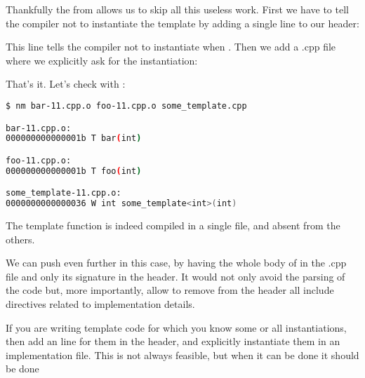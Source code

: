 \bigskip

Thankfully the  from  allows us to skip
all this useless work. First we have to tell the compiler not to
instantiate the template by adding a single line to our header:


This line tells the compiler not to instantiate
 when . Then we add a .cpp file
where we explicitly ask for the instantiation:



That's it. Let's check with :

\begin{lstlisting}[language=bash]
$ nm bar-11.cpp.o foo-11.cpp.o some_template.cpp

bar-11.cpp.o:
000000000000001b T bar(int)

foo-11.cpp.o:
000000000000001b T foo(int)

some_template-11.cpp.o:
0000000000000036 W int some_template<int>(int)
\end{lstlisting}

The template function is indeed compiled in a single file, and absent
from the others.

We can push even further in this case, by having the whole body of
 in the .cpp file and only its signature in the
header. It would not only avoid the parsing of the code but, more
importantly, allow to remove from the header all include directives
related to implementation details.

\begin{guideline}
If you are writing template code for which you know some or all
instantiations, then add an  line for them in
the header, and explicitly instantiate them in an implementation file.
This is not always feasible, but when it can be done it should be done
\end{guideline}
